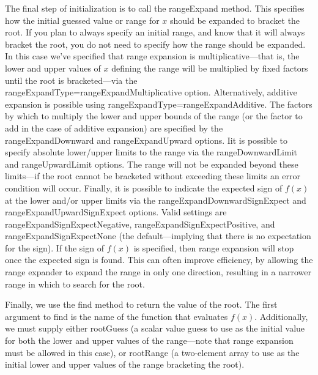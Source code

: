 The final step of initialization is to call the {\normalfont \ttfamily rangeExpand} method. This specifies how the initial guessed value or range for $x$ should be expanded to bracket the root. If you plan to always specify an initial range, and know that it will always bracket the root, you do not need to specify how the range should be expanded. In this case we've specified that range expansion is multiplicative---that is, the lower and upper values of $x$ defining the range will be multiplied by fixed factors until the root is bracketed---via the {\normalfont \ttfamily rangeExpandType=rangeExpandMultiplicative} option. Alternatively, additive expansion is possible using {\normalfont \ttfamily rangeExpandType=rangeExpandAdditive}. The factors by which to multiply the lower and upper bounds of the range (or the factor to add in the case of additive expansion) are specified by the {\normalfont \ttfamily rangeExpandDownward} and {\normalfont \ttfamily rangeExpandUpward} options. Iit is possible to specify absolute lower/upper limits to the range via the {\normalfont \ttfamily rangeDownwardLimit} and {\normalfont \ttfamily rangeUpwardLimit} options. The range will not be expanded beyond these limits---if the root cannot be bracketed without exceeding these limits an error condition will occur. Finally, it is possible to indicate the expected sign of $f(x)$ at the lower and/or upper limits via the {\normalfont \ttfamily rangeExpandDownwardSignExpect} and {\normalfont \ttfamily rangeExpandUpwardSignExpect} options. Valid settings are {\normalfont \ttfamily rangeExpandSignExpectNegative}, {\normalfont \ttfamily rangeExpandSignExpectPositive}, and {\normalfont \ttfamily rangeExpandSignExpectNone} (the default---implying that there is no expectation for the sign). If the sign of $f(x)$ is specified, then range expansion will stop once the expected sign is found. This can often improve efficiency, by allowing the range expander to expand the range in only one direction, resulting in a narrower range in which to search for the root.

Finally, we use the {\normalfont \ttfamily find} method to return the value of the root. The first argument to {\normalfont \ttfamily find} is the name of the function that evaluates $f(x)$. Additionally, we must supply either {\normalfont \ttfamily rootGuess} (a scalar value guess to use as the initial value for both the lower and upper values of the range---note that range expansion must be allowed in this case), or {\normalfont \ttfamily rootRange} (a two-element array to use as the initial lower and upper values of the range bracketing the root).

